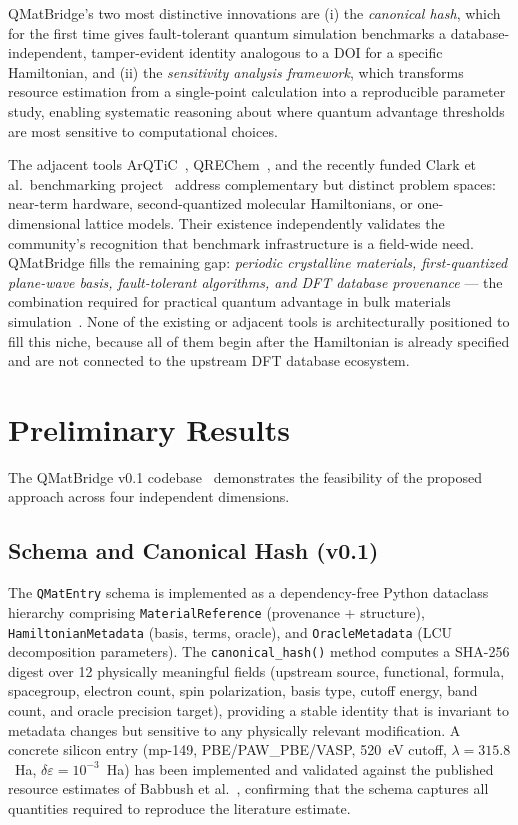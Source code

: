 \documentclass[11pt]{article}
\newcommand{\de}{\delta\varepsilon}
\begin{document}
QMatBridge's two most distinctive innovations are (i) the \emph{canonical
hash}, which for the first time gives fault-tolerant quantum simulation
benchmarks a database-independent, tamper-evident identity analogous to a DOI
for a specific Hamiltonian, and (ii) the \emph{sensitivity analysis framework},
which transforms resource estimation from a single-point calculation into a
reproducible parameter study, enabling systematic reasoning about where
quantum advantage thresholds are most sensitive to computational choices.

The adjacent tools ArQTiC~\cite{ArQTiC2022}, QREChem~\cite{QREChem2023},
and the recently funded Clark et al.\ benchmarking project~\cite{Clark2026}
address complementary but distinct problem spaces: near-term hardware,
second-quantized molecular Hamiltonians, or one-dimensional lattice models.
Their existence independently validates the community's recognition that
benchmark infrastructure is a field-wide need.
QMatBridge fills the remaining gap: \emph{periodic crystalline materials,
first-quantized plane-wave basis, fault-tolerant algorithms, and DFT database
provenance} --- the combination required for practical quantum advantage in
bulk materials simulation~\cite{vonBurg2021,Yoshioka2022,Beverland2022}.
None of the existing or adjacent tools is architecturally positioned to
fill this niche, because all of them begin after the Hamiltonian is already
specified and are not connected to the upstream DFT database ecosystem.

\section{Preliminary Results}

The QMatBridge v0.1 codebase~\cite{QMatBridge2026} demonstrates the
feasibility of the proposed approach across four independent dimensions.

\subsection{Schema and Canonical Hash (v0.1)}

The \texttt{QMatEntry} schema is implemented as a dependency-free Python
dataclass hierarchy comprising \texttt{MaterialReference} (provenance +
structure), \texttt{HamiltonianMetadata} (basis, terms, oracle), and
\texttt{OracleMetadata} (LCU decomposition parameters).
The \texttt{canonical\_hash()} method computes a SHA-256 digest over
12 physically meaningful fields (upstream source, functional, formula,
spacegroup, electron count, spin polarization, basis type, cutoff energy,
band count, and oracle precision target), providing a stable identity
that is invariant to metadata changes but sensitive to any physically
relevant modification.
A concrete silicon entry (mp-149, PBE/PAW\_PBE/VASP, 520~eV cutoff,
$\lambda = 315.8$~Ha, $\de = 10^{-3}$~Ha) has been implemented and
validated against the published resource estimates of Babbush et
al.~\cite{Babbush2019}, confirming that the schema captures all
quantities required to reproduce the literature estimate.
\end{document}

